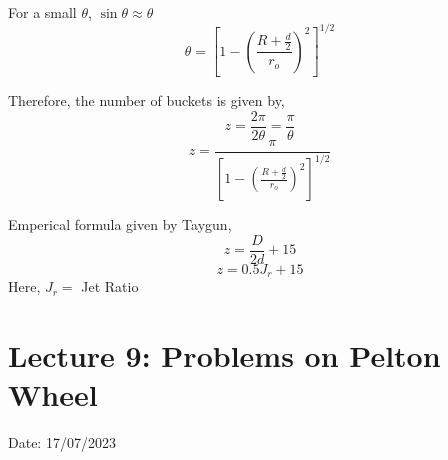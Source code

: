 \documentclass{article}
\begin{document}
\begin{enumerate}
For a small $\theta$, $\sin \theta \approx \theta $
$$\theta = \left[1- \left(\frac{R + \frac{d}{2}}{r_o}\right)^2\right]^{1/2} $$

Therefore, the number of buckets is given by, $$z = \frac{2\pi}{2\theta} = \frac{\pi}{\theta}$$
\begin{equation}
  z = \frac{\pi}{\left[1- \left(\frac{R + \frac{d}{2}}{r_o}\right)^2\right]^{1/2}}
\end{equation}

Emperical formula given by Taygun,
$$z = \frac{D}{2d} + 15$$
\begin{equation}
  z = 0.5 J_r + 15  
\end{equation}
Here, $J_r = $ Jet Ratio 
\end{enumerate}

\vspace*{1cm}
\pagebreak
\section{Lecture 9: Problems on Pelton Wheel}
\hfill Date: 17/07/2023
\end{document}
